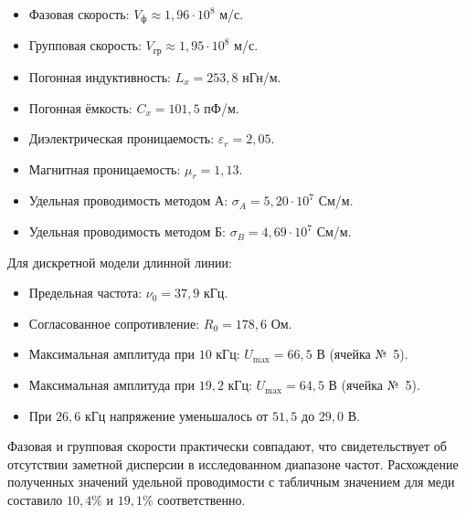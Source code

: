 \documentclass[a4paper,14pt]{extarticle}
\begin{document}
\begin{itemize}
    \item Фазовая скорость:
    $V_{\text{ф}} \approx 1{,}96\cdot10^8$ м/с.

    \item Групповая скорость:
    $V_{\text{гр}} \approx 1{,}95\cdot10^8$ м/с.

    \item Погонная индуктивность:
    $L_x = 253{,}8$ нГн/м.

    \item Погонная ёмкость:
    $C_x = 101{,}5$ пФ/м.

    \item Диэлектрическая проницаемость:
    $\varepsilon_r = 2{,}05$.

    \item Магнитная проницаемость:
    $\mu_r = 1{,}13$.

    \item Удельная проводимость методом А:
    $\sigma_A = 5{,}20\cdot10^7$ См/м.

    \item Удельная проводимость методом Б:
    $\sigma_B = 4{,}69\cdot10^7$ См/м.
\end{itemize}

Для дискретной модели длинной линии:

\begin{itemize}
    \item Предельная частота:
    $\nu_0 = 37{,}9$ кГц.

    \item Согласованное сопротивление:
    $R_0 = 178{,}6$ Ом.

    \item Максимальная амплитуда при $10$ кГц:
    $U_{\max} = 66{,}5$ В (ячейка №~5).

    \item Максимальная амплитуда при $19{,}2$ кГц:
    $U_{\max} = 64{,}5$ В (ячейка №~5).

    \item При $26{,}6$ кГц напряжение уменьшалось
    от $51{,}5$ до $29{,}0$ В.
\end{itemize}

Фазовая и групповая скорости практически совпадают,
что свидетельствует об отсутствии заметной дисперсии
в исследованном диапазоне частот.
Расхождение полученных значений удельной проводимости
с табличным значением для меди составило
$10{,}4\%$ и $19{,}1\%$ соответственно.
\end{document}
